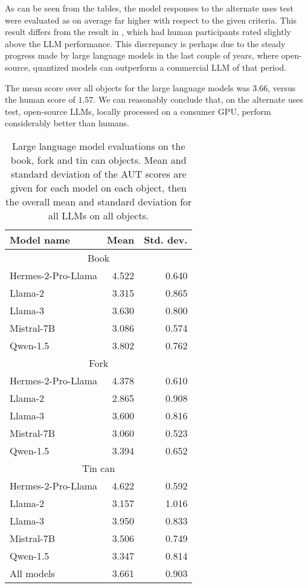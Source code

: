 \documentclass{article}
\begin{document}
As can be seen from the tables, the model responses to the alternate uses test were evaluated as on average far higher with respect to the given criteria. This result differs from the result in \cite{stevenson2022puttinggpt3screativityalternative}, which had human participants rated slightly above the LLM performance. This discrepancy is perhaps due to the steady progress made by large language models in the last couple of years, where open-source, quantized models can outperform a commercial LLM of that period.   

The mean score over all objects for the large language models was $3.66$, versus the human score of $1.57$. We can reasonably conclude that, on the alternate uses test, open-source LLMs, locally processed on a consumer GPU, perform considerably better than humans.  

\begin{table}
\centering
\begin{tabular}{lrr}
\toprule
Model name & Mean & Std. dev. \\
\toprule
\multicolumn{3}{c}{Book} \\
\toprule
Hermes-2-Pro-Llama & 4.522 & 0.640 \\
Llama-2 & 3.315 & 0.865 \\
Llama-3 & 3.630 & 0.800 \\
Mistral-7B & 3.086 & 0.574 \\
Qwen-1.5 & 3.802 & 0.762 \\
\toprule
\multicolumn{3}{c}{Fork} \\
\toprule
Hermes-2-Pro-Llama & 4.378 & 0.610 \\
Llama-2 & 2.865 & 0.908 \\
Llama-3 & 3.600 & 0.816 \\
Mistral-7B & 3.060 & 0.523 \\
Qwen-1.5 & 3.394 & 0.652 \\
\toprule
\multicolumn{3}{c}{Tin can} \\
\toprule
Hermes-2-Pro-Llama & 4.622 & 0.592 \\
Llama-2 & 3.157 & 1.016 \\
Llama-3 & 3.950 & 0.833 \\
Mistral-7B & 3.506 & 0.749 \\
Qwen-1.5 & 3.347 & 0.814 \\
\midrule
All models & 3.661 & 0.903 \\ 
\bottomrule
\end{tabular}
\vspace{2mm}
\caption{Large language model evaluations on the book, fork and tin can objects. Mean and standard deviation of the AUT scores are given for each model on each object, then the overall mean and standard deviation for all LLMs on all objects.}
\label{book_fork_tincan:model_results}
\end{table}
\end{document}

